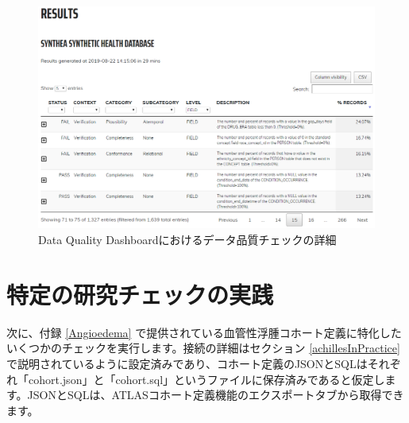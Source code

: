 \documentclass[
  11pt]{book}
\newenvironment{Shaded}{\begin{snugshade}}{\end{snugshade}}
\newcommand{\AttributeTok}[1]{\textcolor[rgb]{0.13,0.29,0.53}{#1}}
\newcommand{\FunctionTok}[1]{\textcolor[rgb]{0.13,0.29,0.53}{\textbf{#1}}}
\newcommand{\NormalTok}[1]{#1}
\newcommand{\OtherTok}[1]{\textcolor[rgb]{0.56,0.35,0.01}{#1}}
\newcommand{\SpecialCharTok}[1]{\textcolor[rgb]{0.81,0.36,0.00}{\textbf{#1}}}
\newcommand{\StringTok}[1]{\textcolor[rgb]{0.31,0.60,0.02}{#1}}
\theoremstyle{definition}
\theoremstyle{definition}
\theoremstyle{definition}
\theoremstyle{definition}
\theoremstyle{remark}
\begin{document}
\begin{figure}

{\centering \includegraphics[width=1\linewidth]{images/DataQuality/dqdResults} 

}

\caption{Data Quality Dashboardにおけるデータ品質チェックの詳細}\label{fig:dqdResults}
\end{figure}

\section{特定の研究チェックの実践}\label{ux7279ux5b9aux306eux7814ux7a76ux30c1ux30a7ux30c3ux30afux306eux5b9fux8df5}

次に、付録 \ref{Angioedema} で提供されている血管性浮腫コホート定義に特化したいくつかのチェックを実行します。接続の詳細はセクション \ref{achillesInPractice} で説明されているように設定済みであり、コホート定義のJSONとSQLはそれぞれ「cohort.json」と「cohort.sql」というファイルに保存済みであると仮定します。JSONとSQLは、ATLASコホート定義機能のエクスポートタブから取得できます。

\begin{Shaded}
\end{Shaded}
\end{document}
